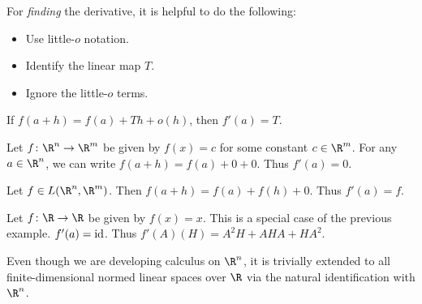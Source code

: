 For \emph{finding} the derivative, it is helpful to do the following:
\begin{itemize}
    \item Use little-$o$ notation.
    \item Identify the linear map $T$.
    \item Ignore the little-$o$ terms.
\end{itemize}
If $f(a + h) = f(a) + Th + o(h)$, then $f'(a) = T$.

\begin{examples}
    \item Let $f\colon \R^n \to \R^m$ be given by $f(x) = c$
        for some constant $c \in \R^m$.
        For any $a \in \R^n$, we can write
        $f(a + h) = f(a) + 0 + 0$.
        Thus $f'(a) = 0$.
    \item Let $f \in L(\R^n, \R^m)$.
        Then $f(a + h) = f(a) + f(h) + 0$.
        Thus $f'(a) = f$.
    \item Let $f\colon \R \to \R$ be given by $f(x) = x$.
        This is a special case of the previous example.
        $f'(a) = \operatorname{id}$.
    Thus $f'(A)(H) = A^2 H + A H A + H A^2$.
\end{examples}

Even though we are developing calculus on $\R^n$, it is trivially extended
to all finite-dimensional normed linear spaces over $\R$ via the natural
identification with $\R^n$.
